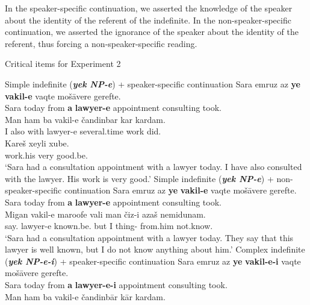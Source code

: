 \documentclass[output=paper]{langsci/langscibook}
\begin{document}
In the speaker-specific continuation, we asserted the knowledge of the speaker about the identity of the referent of the indefinite. In the non-speaker-specific continuation, we asserted the ignorance of the speaker about the identity of the referent, thus forcing a non-speaker-specific reading.

\begin{exe}
\ex\label{4ex:34}
Critical items for Experiment 2 
	\begin{xlista}
	\ex\label{4ex:34a}
	Simple indefinite ({\bf\emph{yek NP-e}}) + speaker-specific continuation
	\exi{}
	\gll	Sara	emruz	az	{\bf{ye}} 	{\bf{vakil-e}}	 	vaqte 		mošāvere	gerefte. \\
		Sara	today	from	{\bf{a}} 	{\bf{lawyer-e}}	 	appointment	consulting 	took.{} \\
	\glt
	\exi{}
	\gll	Man ham ba	vakil-e 	čandinbar  	kar    kardam. \\
		I	also with lawyer-e	several.time work did.{} \\
	\glt
	\exi{}
	\gll	Kareš	xeyli 	xube. \\
		work.his 	very		good.be.{} \\
	\glt `Sara had a consultation appointment with a lawyer today. I have also consulted with the lawyer. His work is very good.'
	\ex\label{4ex:34b}
	Simple indefinite ({\bf\emph{yek NP-e}}) + non-speaker-specific continuation
	\exi{}
	\gll	Sara	emruz az		{\bf{ye}} {\bf{vakil-e}}	 vaqte 	        	mošāvere		gerefte.  \\
		Sara	today	 from		{\bf{a}} {\bf{lawyer-e}} 	appointment 	consulting    	took.{} \\
	\glt
	\exi{}
	\gll	Migan    vakil-e	 maroofe		  vali man čiz-i		  azaš	    nemidunam. \\
		say.{} lawyer-e known.be.{} but	I	   thing-{} from.him not.know.{} \\
	\glt	`{Sara had a consultation appointment with a lawyer today. They say that this lawyer is well known, but I do not know anything about him.}'
\filbreak
	\ex\label{4ex:34c}
	Complex indefinite ({\bf\emph{yek NP-e-i}}) + speaker-specific continuation
	\exi{}
	\gll	Sara emruz	az	    	{\bf{ye}} {\bf{vakil-e-i}}	vaqte 		mošāvere	gerefte. \\
		Sara today	from 		{\bf{a}} {\bf{lawyer-e-i}} 	appointment	consulting		took.{} \\
	\glt 
	\exi{}
	\gll	Man ham ba	vakil-e    čandinbār  kār    kardam.   \\

\end{xlista}
\end{exe}
\end{document}
